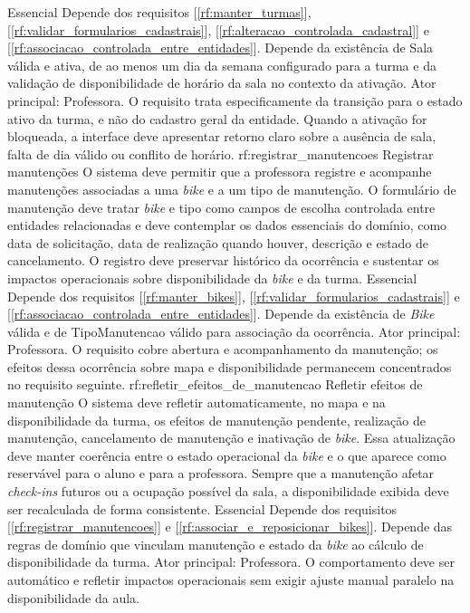 {Essencial}
{Depende dos requisitos [\ref{rf:manter_turmas}], [\ref{rf:validar_formularios_cadastrais}], [\ref{rf:alteracao_controlada_cadastral}] e [\ref{rf:associacao_controlada_entre_entidades}]. Depende da existência de Sala válida e ativa, de ao menos um dia da semana configurado para a turma e da validação de disponibilidade de horário da sala no contexto da ativação.}
{Ator principal: Professora. O requisito trata especificamente da transição para o estado ativo da turma, e não do cadastro geral da entidade. Quando a ativação for bloqueada, a interface deve apresentar retorno claro sobre a ausência de sala, falta de dia válido ou conflito de horário.}
\reqfuncfull
{rf:registrar_manutencoes}
{Registrar manutenções}
{O sistema deve permitir que a professora registre e acompanhe manutenções associadas a uma \textit{bike} e a um tipo de manutenção. O formulário de manutenção deve tratar \textit{bike} e tipo como campos de escolha controlada entre entidades relacionadas e deve contemplar os dados essenciais do domínio, como data de solicitação, data de realização quando houver, descrição e estado de cancelamento. O registro deve preservar histórico da ocorrência e sustentar os impactos operacionais sobre disponibilidade da \textit{bike} e da turma.}
{Essencial}
{Depende dos requisitos [\ref{rf:manter_bikes}], [\ref{rf:validar_formularios_cadastrais}] e [\ref{rf:associacao_controlada_entre_entidades}]. Depende da existência de \textit{Bike} válida e de TipoManutencao válido para associação da ocorrência.}
{Ator principal: Professora. O requisito cobre abertura e acompanhamento da manutenção; os efeitos dessa ocorrência sobre mapa e disponibilidade permanecem concentrados no requisito seguinte.}
\reqfuncfull
{rf:refletir_efeitos_de_manutencao}
{Refletir efeitos de manutenção}
{O sistema deve refletir automaticamente, no mapa e na disponibilidade da turma, os efeitos de manutenção pendente, realização de manutenção, cancelamento de manutenção e inativação de \textit{bike}. Essa atualização deve manter coerência entre o estado operacional da \textit{bike} e o que aparece como reservável para o aluno e para a professora. Sempre que a manutenção afetar \textit{check-ins} futuros ou a ocupação possível da sala, a disponibilidade exibida deve ser recalculada de forma consistente.}
{Essencial}
{Depende dos requisitos [\ref{rf:registrar_manutencoes}] e [\ref{rf:associar_e_reposicionar_bikes}]. Depende das regras de domínio que vinculam manutenção e estado da \textit{bike} ao cálculo de disponibilidade da turma.}
{Ator principal: Professora. O comportamento deve ser automático e refletir impactos operacionais sem exigir ajuste manual paralelo na disponibilidade da aula.}
